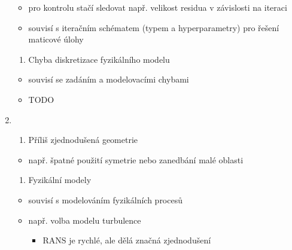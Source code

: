 \documentclass[letterpaper,10pt,czech]{sphinxmanual}
\begin{document}
\begin{enumerate}
\begin{itemize}
\item {} 
\sphinxAtStartPar
pro kontrolu stačí sledovat např. velikost residua v závislosti na iteraci

\item {} 
\sphinxAtStartPar
souvisí s iteračním schématem (typem a hyperparametry) pro řešení maticové úlohy

\end{itemize}
\begin{enumerate}
%
\setcounter{enumii}{3}
\item {} 
\sphinxAtStartPar
Chyba diskretizace fyzikálního modelu

\end{enumerate}
\begin{itemize}
\item {} 
\sphinxAtStartPar
souvisí se zadáním a modelovacími chybami

\item {} 
\sphinxAtStartPar
TODO

\end{itemize}

\item {} 
\sphinxAtStartPar
{}
\begin{enumerate}
%
\item {} 
\sphinxAtStartPar
Příliš zjednodušená geometrie

\end{enumerate}
\begin{itemize}
\item {} 
\sphinxAtStartPar
např. špatné použití symetrie nebo zanedbání malé oblasti

\end{itemize}
\begin{enumerate}
%
\setcounter{enumii}{1}
\item {} 
\sphinxAtStartPar
Fyzikální modely

\end{enumerate}
\begin{itemize}
\item {} 
\sphinxAtStartPar
souvisí s modelováním fyzikálních procesů

\item {} 
\sphinxAtStartPar
např. volba modelu turbulence
\begin{itemize}
\item {} 
\sphinxAtStartPar
RANS je rychlé, ale dělá značná zjednodušení


\end{itemize}
\end{itemize}
\end{enumerate}
\end{document}
